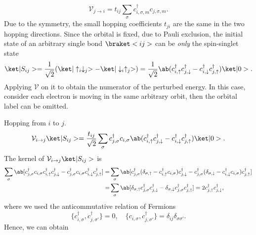 \begin{solution}
\begin{enumext}[label = \Roman*.]
\begin{enumext}
\[        \mathcal V_{j\to i}
      = t_{ij} \sum_\sigma c_{i,\sigma,m}^\dagger c_{j,\sigma,m}.
      \]
      Due to the symmetry, the small hopping coefficients $t_{ji}$ are the same
      in the two hopping directions. Since the orbital is fixed, due to Pauli
      exclusion, the initial state of an arbitrary single bond $\braket<ij>$ can
      be \emph{only} the spin-singlet state
      \[
        \ket|S_{ij}> = \frac1{\sqrt2}
          (\ket|\uparrow_i\downarrow_j> - \ket|\downarrow_i\uparrow_j>)
      = \frac1{\sqrt2} \ab(
          c_{i,\uparrow}^\dagger c_{j,\downarrow}^\dagger
        - c_{i,\downarrow}^\dagger c_{j,\uparrow}^\dagger) \ket|0>.
      \]
      Applying $\mathcal V$ on it to obtain the numerator of the
      perturbed energy. In this case, consider each electron is moving in the
      same arbitrary orbit, then the orbital label can be omitted.
      \begin{enumext}[label = \arabic*.]
        \item Hopping from $i$ to $j$.
        \[
          \mathcal V_{i\to j} \ket|S_{ij}>
        = \frac{t_{ij}}{\sqrt2} \sum_\sigma
          c_{j,\sigma}^\dagger c_{i,\sigma} \ab(
          c_{i,\uparrow}^\dagger c_{j,\downarrow}^\dagger
        - c_{i,\downarrow}^\dagger c_{j,\uparrow}^\dagger) \ket|0>.
        \]
        The kernel of $\mathcal V_{i\to j} \ket|S_{ij}>$ is
        \begin{align*}
          \sum_\sigma \ab[c_{j,\sigma}^\dagger c_{i,\sigma}
          c_{i,\uparrow}^\dagger c_{j,\downarrow}^\dagger
        - c_{j,\sigma}^\dagger c_{i,\sigma}
          c_{i,\downarrow}^\dagger c_{j,\uparrow}^\dagger]
        = & \sum_\sigma \ab[c_{j,\sigma}^\dagger (\delta_{\sigma,\uparrow} -
          c_{i,\uparrow}^\dagger c_{i,\sigma})   c_{j,\downarrow}^\dagger
        - c_{j,\sigma}^\dagger (\delta_{\sigma,\downarrow} -
          c_{i,\downarrow}^\dagger c_{i,\sigma}) c_{j,\uparrow}^\dagger]\\
        = & \sum_\sigma \ab[\delta_{\sigma,\uparrow}
            c_{j,\sigma}^\dagger c_{j,\downarrow}^\dagger
        - \delta_{\sigma,\downarrow}
          c_{j,\sigma}^\dagger c_{j,\uparrow}^\dagger]
        = 2c_{j,\uparrow}^\dagger c_{j,\downarrow}^\dagger,
        \end{align*}
        where we used the anticommutative relation of Fermions
        \[
          \{c_{i,\sigma}^\dagger, c_{j,\sigma'}^\dagger\} = 0, \quad
          \{c_{i,\sigma}, c_{j,\sigma'}^\dagger\}
        = \delta_{ij}\delta_{\sigma\sigma'}.
        \]
        Hence, we can obtain
        \[
\]
\end{enumext}
\end{enumext}
\end{enumext}
\end{solution}
